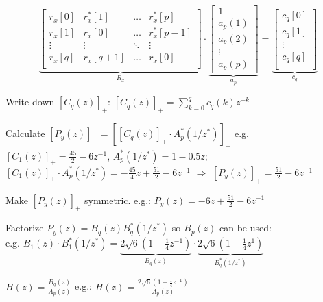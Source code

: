 \begin{aufzaehlung}
			\small$$
\underbrace{\begin{bmatrix}                   
			r_x[0] & r_x^*[1] & \hdots & r_x^*[p] \\   
			r_x[1] & r_x[0] & \hdots & r_x^*[p-1] \\    
			\vdots & \vdots & \ddots & \vdots \\     
			r_x[q] & r_x[q+1] & \hdots & r_x[0] \\ 
		\end{bmatrix}  }_{R_x} \cdot \underbrace{\begin{bmatrix}
			1 \\
			a_p(1) \\
			a_p(2) \\
			\vdots \\
			a_p(p)
		\end{bmatrix}  }_{a_p}= \underbrace{\begin{bmatrix}
				c_q[0]\\            
				c_q[1]\\
			\vdots \\
				c_q[q]\\
		\end{bmatrix}}_{c_{q}} 
			$$ \normalsize	 
			\item Write down $[C_q(z)]_+$: $[C_q(z)]_+ = \sum\limits_{k=0}^q c_q(k)z^{-k}$
			\item Calculate $[P_y(z)]_+=\left[[C_q(z)]_+ \cdot A^*_p(1/z^*)\right]_+$ e.g. $[C_1(z)]_+=\frac{45}{2}-6z^{-1}$, $A^*_p(1/z^*)=1-0.5z$; $[C_1(z)]_+ \cdot A^*_p(1/z^*)= -\frac{45}{4}z +\frac{51}{2}-6z^{-1}$ $\Rightarrow$  $[P_y(z)]_+= \frac{51}{2}-6z^{-1}$
			\item Make $[P_y(z)]_+$ symmetric. e.g.: $P_y(z) =  -6 z +\frac{51}{2}-6z^{-1}$
			\item Factorize $P_y(z)=B_q(z)B_q^*(1/z^*)$ so $B_p(z)$ can be used: \\
			e.g. $B_1(z)\cdot B_1^*(1/z^*)= \underbrace{2\sqrt{6}(1-\frac{1}{4}z^{-1})}_{B_q(z)}\cdot \underbrace{2\sqrt{6}(1-\frac{1}{4}z^{1})}_{B_q^*(1/z^*)}$
			\item $H(z)=\frac{B_q(z)}{A_p(z)}$ e.g.: $H(z)=\frac{2 \sqrt{6}(1-\frac 1 4 z^{-1})}{A_p(z)}$
\end{aufzaehlung}


